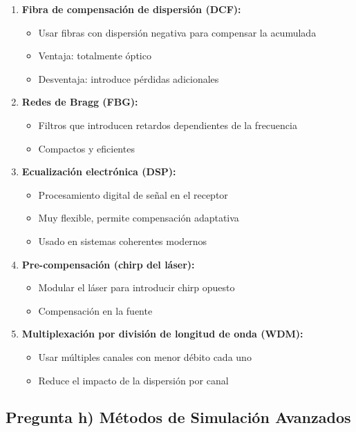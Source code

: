 \documentclass[11pt,a4paper]{article}
\begin{document}
\begin{enumerate}
    \item \textbf{Fibra de compensación de dispersión (DCF):}
    \begin{itemize}
        \item Usar fibras con dispersión negativa para compensar la acumulada
        \item Ventaja: totalmente óptico
        \item Desventaja: introduce pérdidas adicionales
    \end{itemize}
    
    \item \textbf{Redes de Bragg (FBG):}
    \begin{itemize}
        \item Filtros que introducen retardos dependientes de la frecuencia
        \item Compactos y eficientes
    \end{itemize}
    
    \item \textbf{Ecualización electrónica (DSP):}
    \begin{itemize}
        \item Procesamiento digital de señal en el receptor
        \item Muy flexible, permite compensación adaptativa
        \item Usado en sistemas coherentes modernos
    \end{itemize}
    
    \item \textbf{Pre-compensación (chirp del láser):}
    \begin{itemize}
        \item Modular el láser para introducir chirp opuesto
        \item Compensación en la fuente
    \end{itemize}
    
    \item \textbf{Multiplexación por división de longitud de onda (WDM):}
    \begin{itemize}
        \item Usar múltiples canales con menor débito cada uno
        \item Reduce el impacto de la dispersión por canal
    \end{itemize}
\end{enumerate}

\subsection{Pregunta h) Métodos de Simulación Avanzados}
\end{document}
